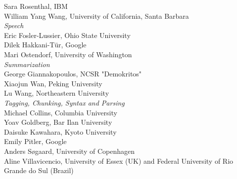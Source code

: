                                     \hspace*{0.2in} Sara Rosenthal, IBM \\
                                    \hspace*{0.2in} William Yang Wang, University of California, Santa Barbara \\
                            \emph{Speech} \\
                                    \hspace*{0.2in} Eric Fosler-Lussier, Ohio State University \\
                                    \hspace*{0.2in} Dilek Hakkani-Tür, Google \\
                                    \hspace*{0.2in} Mari Ostendorf, University of Washington \\
                            \emph{Summarization} \\
                                    \hspace*{0.2in} George Giannakopoulos, NCSR "Demokritos" \\
                                    \hspace*{0.2in} Xiaojun Wan, Peking University \\
                                    \hspace*{0.2in} Lu Wang, Northeastern University \\
                            \emph{Tagging, Chunking, Syntax and Parsing} \\
                                    \hspace*{0.2in} Michael Collins, Columbia University \\
                                    \hspace*{0.2in} Yoav Goldberg, Bar Ilan University \\
                                    \hspace*{0.2in} Daisuke Kawahara, Kyoto University \\
                                    \hspace*{0.2in} Emily Pitler, Google \\
                                    \hspace*{0.2in} Anders S{\o}gaard, University of Copenhagen \\
                                    \hspace*{0.2in} Aline Villavicencio, University of Essex (UK) and Federal University of Rio Grande do Sul (Brazil) \\
